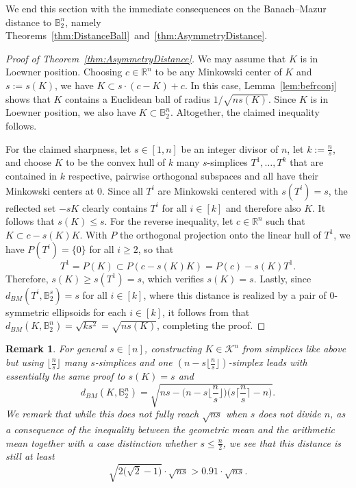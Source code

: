 \documentclass{amsart}
\newtheorem{remark}[theorem]{Remark}
\newcommand\R{\mathbb{R}}
\newcommand\B{\mathbb{B}}
\newcommand\CK{\mathcal{K}}
\begin{document}
We end this section with the immediate consequences on the Banach--Mazur distance to $\B_2^n$, namely Theorems~\ref{thm:DistanceBall}~and~\ref{thm:AsymmetryDistance}.



\begin{proof}[Proof of Theorem~\ref{thm:AsymmetryDistance}]
We may assume that $K$ is in Loewner position.
Choosing $c \in \R^n$ to be any Minkowski center of $K$ and $s := s(K)$,
we have $K \subset s \cdot (c - K) + c$.
In this case, Lemma~\ref{lem:befrconj} shows that $K$ contains a Euclidean ball of radius $1/\sqrt{n s(K)}$.
Since $K$ is in Loewner position, we also have $K \subset \B_2^n$.
Altogether, the claimed inequality follows.

For the claimed sharpness, let $s \in [1,n]$ be an integer divisor of $n$, let $k := \frac{n}{s}$, and choose $K$ to be the convex hull of $k$ many $s$-simplices $T^1, \dots, T^k$ that are contained in $k$ respective, pairwise orthogonal subspaces and all have their Minkowski centers at $0$.
Since all $T^i$ are Minkowski centered with $s(T^i) = s$,
the reflected set $-sK$ clearly contains $T^i$ for all $i \in [k]$ and therefore also $K$.
It follows that $s(K) \leq s$.
For the reverse inequality, let $c \in \R^n$ such that $K \subset c - s(K) K$.
With $P$ the orthogonal projection onto the linear hull of $T^1$, we have $P(T^i) = \{0\}$ for all $i \geq 2$, so that
\[
    T^1
    = P(K)
    \subset P(c - s(K) K)
    = P(c) - s(K) T^1.
\]
Therefore, $s(K) \geq s(T^1) = s$, which verifies $s(K) = s$.
Lastly, since $d_{BM}(T^i,\B_2^s) = s$ for all $i \in [k]$, where this distance is realized by a pair of $0$-symmetric ellipsoids for each $i \in [k]$, it follows from \cite[Remark~$2.5$]{2026:GrundbacherKobos} that $d_{BM}(K,\B_2^n) = \sqrt{ k s^2 } = \sqrt{n s(K)}$, completing the proof.
\end{proof}



\begin{remark}\label{rem:Litvak}
For general $s \in [n]$, constructing $K \in \CK^n$ from simplices like above but using $\lfloor \frac{n}{s} \rfloor$ many $s$-simplices and one $(n - s \lfloor \frac{n}{s} \rfloor)$-simplex leads with essentially the same proof to $s(K) = s$ and
\[
    d_{BM}(K,\B_2^n)
    = \sqrt{ns - \bigg( n - s \bigg\lfloor \frac{n}{s} \bigg\rfloor \bigg) \bigg( s \bigg\lceil \frac{n}{s} \bigg\rceil - n \bigg)}.
\]
We remark that while this does not fully reach $\sqrt{n s}$ when $s$ does not divide $n$,
as a consequence of the inequality between the geometric mean and the arithmetic mean
together with a case distinction whether $s \leq \frac{n}{2}$,
we see that this distance is still at least
\[
    \sqrt{2 \big( \sqrt{2}-1 \big)} \cdot \sqrt{n s}
    > 0.91 \cdot \sqrt{n s}.
\]
\end{remark}
\end{document}
